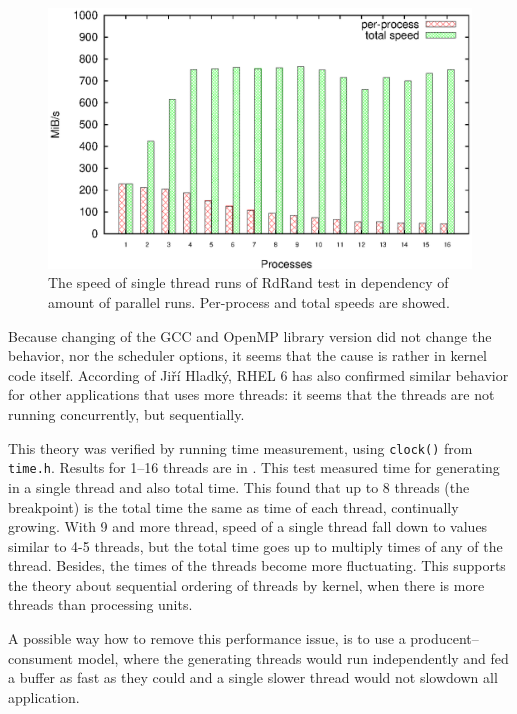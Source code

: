 \begin{figure}[h!]
  \centering
 \includegraphics[width=15cm]{fig/tests/r6_parallel.eps} %
\caption{The speed of single thread runs of RdRand test in dependency of amount of parallel runs. Per-process and total speeds are showed.}
\label{fig:testing:r6parallel}
\end{figure}

\par{
Because changing of the GCC and OpenMP library version did not change the behavior, nor the scheduler options, it seems that the cause is rather in kernel code itself. According of Jiří Hladký, RHEL 6 has also confirmed similar behavior for other applications that uses more threads: it seems that the threads are not running concurrently, but sequentially.
}

\par{
This theory was verified by running time measurement, using {\tt clock()} from {\tt time.h}. Results for 1--16 threads are in . This test measured time for generating in a single thread and also total time. This found that up to 8 threads (the breakpoint) is the total time the same as time of each thread, continually growing. With 9 and more thread, speed of a single thread fall down to values similar to 4-5 threads, but the total time goes up to multiply times of any of the thread. Besides, the times of the threads become more fluctuating. This supports the theory about sequential ordering of threads by kernel, when there is more threads than processing units.
}

\par{
A possible way how to remove this performance issue, is to use a producent--consument model, where the generating threads would run independently and fed a buffer as fast as they could and a single slower thread would not slowdown all application.
}

